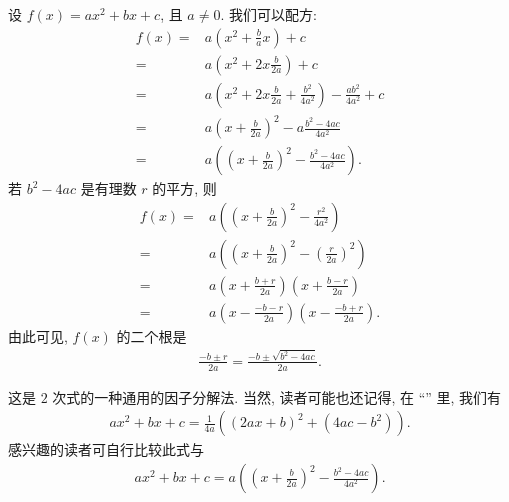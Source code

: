 \begin{example}
    设 $f(x) = ax^2 + bx + c$, 且 $a \neq 0$. 我们可以配方:
    \begin{align*}
        f(x)
        = {} & a \left( x^2 + \frac{b}{a} x \right) + c                                          \\
        = {} & a \left( x^2 + 2x \frac{b}{2a} \right) + c                                        \\
        = {} & a \left( x^2 + 2x \frac{b}{2a} + \frac{b^2}{4a^2} \right) - \frac{ab^2}{4a^2} + c \\
        = {} & a \left( x + \frac{b}{2a} \right)^2 - a \frac{b^2 - 4ac}{4a^2}                    \\
        = {} & a \left( \left( x + \frac{b}{2a} \right)^2 - \frac{b^2 - 4ac}{4a^2} \right).
    \end{align*}
    若 $b^2 - 4ac$ 是有理数 $r$ 的平方, 则
    \begin{align*}
        f(x)
        = {} & a \left( \left( x + \frac{b}{2a} \right)^2 - \frac{r^2}{4a^2} \right)              \\
        = {} & a \left( \left( x + \frac{b}{2a} \right)^2 - \left( \frac{r}{2a} \right)^2 \right) \\
        = {} & a \left( x + \frac{b + r}{2a} \right) \left( x + \frac{b - r}{2a} \right)          \\
        = {} & a \left( x - \frac{-b - r}{2a} \right) \left( x - \frac{-b + r}{2a} \right).
    \end{align*}
    由此可见, $f(x)$ 的二个根是
    \begin{align*}
        \frac{-b \pm r}{2a} = \frac{-b \pm \sqrt{b^2 - 4ac}}{2a}.
    \end{align*}

    这是 $2$ 次式的一种通用的因子分解法. 当然, 读者可能也还记得, 在 ``\FactorsOfHigherDegreeOfPolynomialsOverQ '' 里, 我们有
    \begin{align*}
        ax^2 + bx + c = \frac{1}{4a} ((2ax + b)^2 + (4ac - b^2)).
    \end{align*}
    感兴趣的读者可自行比较此式与
    \begin{align*}
        ax^2 + bx + c = a \left( \left( x + \frac{b}{2a} \right)^2 - \frac{b^2 - 4ac}{4a^2} \right).
    \end{align*}
\end{example}

